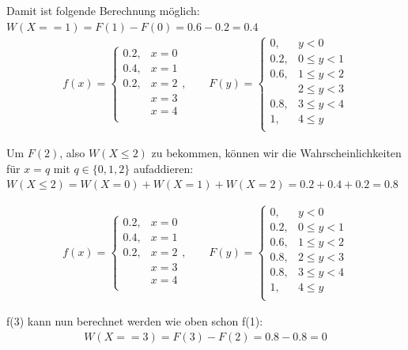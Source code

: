 \documentclass[11pt, a4paper]{article}
\begin{document}
	Damit ist folgende Berechnung möglich: $W(X == 1) = F(1) - F(0) = 0.6 - 0.2 = 0.4$
	\begin{align*}
		f(x) = 
		\begin{cases}
			0.2, & x = 0 \\
			0.4, & x = 1 \\
			0.2, & x = 2 \\
			& x = 3 \\
			& x = 4 \\
		\end{cases}, \qquad
		F(y) =
		\begin{cases}
			0, & y < 0 \\
			0.2, & 0 \leq y < 1 \\
			0.6, & 1 \leq y < 2 \\
			& 2 \leq y < 3 \\
			0.8, & 3 \leq y < 4 \\
			1, & 4 \leq y \\
		\end{cases}
	\end{align*}

	Um $F(2)$, also $W(X \leq 2)$ zu bekommen, können wir die Wahrscheinlichkeiten für $x = q \text{ mit } q \in \{0,1,2\}$ aufaddieren: $W(X \leq 2) = W(X = 0) + W(X = 1) + W(X = 2) = 0.2 + 0.4 + 0.2 = 0.8$

	\begin{align*}
		f(x) = 
		\begin{cases}
			0.2, & x = 0 \\
			0.4, & x = 1 \\
			0.2, & x = 2 \\
			& x = 3 \\
			& x = 4 \\
		\end{cases}, \qquad
		F(y) =
		\begin{cases}
			0, & y < 0 \\
			0.2, & 0 \leq y < 1 \\
			0.6, & 1 \leq y < 2 \\
			0.8, & 2 \leq y < 3 \\
			0.8, & 3 \leq y < 4 \\
			1, & 4 \leq y \\
		\end{cases}
	\end{align*}

	f(3) kann nun berechnet werden wie oben schon f(1):
	\begin{align*}
		W(X == 3) = F(3) - F(2) = 0.8 - 0.8 = 0
	\end{align*}
\end{document}
